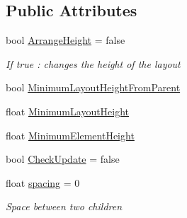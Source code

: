 \subsection*{Public Attributes}
\begin{DoxyCompactItemize}
\item 
bool \hyperlink{class_simple_vertical_layout_ac7e7b55272bbe3968b87392a6f313d31}{Arrange\+Height} = false
\begin{DoxyCompactList}\small\item\em If true \+: changes the height of the layout \end{DoxyCompactList}\item 
bool \hyperlink{class_simple_vertical_layout_ab2e42919543ab91be8672e129fcd649f}{Minimum\+Layout\+Height\+From\+Parent}
\item 
float \hyperlink{class_simple_vertical_layout_adf920fc252e7d6450220edbf8ed32a81}{Minimum\+Layout\+Height}
\item 
float \hyperlink{class_simple_vertical_layout_a91ac3fb56d8ffb4f2377e1e28b73b845}{Minimum\+Element\+Height}
\item 
bool \hyperlink{class_simple_vertical_layout_a08b5cd713452d59ca8d38b504d2891d6}{Check\+Update} = false
\item 
float \hyperlink{class_simple_vertical_layout_a5c23f05dce287e2bee4189a31dbf0e78}{spacing} = 0
\begin{DoxyCompactList}\small\item\em Space between two children \end{DoxyCompactList}\end{DoxyCompactItemize}
